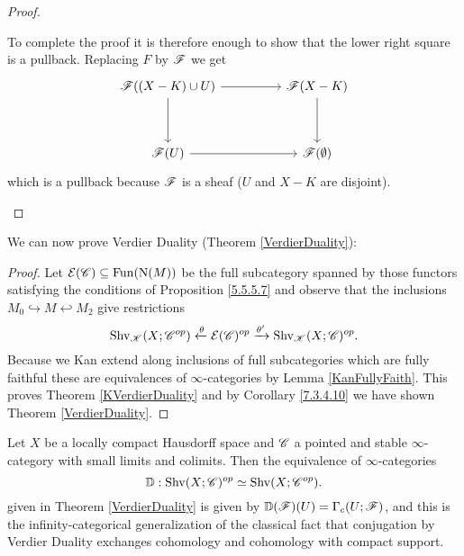 \documentclass[../../thesis.tex]{subfiles}
\begin{document}
\begin{proof}
\begin{enumerate}[label=(\alph*)]
              To complete the proof it is therefore enough to show that the lower right square is a pullback.
              Replacing $F$ by $\mathscr{F}$ we get
              \[\begin{tikzcd}
                      {\F((X-K) \cup U)} && {\F(X-K)} \\
                      \\
                      {\F(U)} && {\F(\emptyset)}
                      \arrow[from=1-1, to=1-3]
                      \arrow[from=1-3, to=3-3]
                      \arrow[from=3-1, to=3-3]
                      \arrow[from=1-1, to=3-1]
                  \end{tikzcd}\]
              which is a pullback because $\mathscr{F}$ is a sheaf ($U$ and $X-K$ are disjoint).
    \end{enumerate}
\end{proof}
We can now prove Verdier Duality (Theorem \ref{VerdierDuality}):
\begin{proof}
    Let $\mathcal{E}(\mathscr{C}) \subseteq \mathrm{Fun}(\mathrm{N}(M))$ be the full subcategory spanned by those functors satisfying the conditions of Proposition \ref{5.5.5.7} and observe that the inclusions $M_0 \hookrightarrow M \hookleftarrow M_2$ give restrictions
    \[
        \mathrm{Shv}_{\mathscr{K}}(X;\mathscr{C}^{op}) \xleftarrow{\theta} \mathcal{E}(\mathscr{C})^{op} \xrightarrow{\theta'} \mathrm{Shv}_{\mathscr{K}}(X;\mathscr{C})^{op}.
    \]
    Because we Kan extend along inclusions of full subcategories which are fully faithful these are equivalences of $\infty$-categories by Lemma \ref{KanFullyFaith}.
    This proves Theorem \ref{KVerdierDuality} and by Corollary \ref{7.3.4.10} we have shown Theorem \ref{VerdierDuality}.
\end{proof}
\begin{proposition}[{\cite[Proposition 5.5.5.10]{HA}}]
    Let $X$ be a locally compact Hausdorff space and $\mathscr{C}$ a pointed and stable $\infty$-category with small limits and colimits.
    Then the equivalence of $\infty$-categories
    \[
        \mathbb{D} : \mathrm{Shv}(X;\mathscr{C})^{op} \simeq \mathrm{Shv}(X;\mathscr{C}^{op}).
    \]
    given in Theorem \ref{VerdierDuality} is given by $\mathbb{D}(\mathscr{F})(U) = \Gamma_c(U;\mathscr{F})$, and this is the infinity-categorical generalization of the classical fact that conjugation by Verdier Duality exchanges cohomology and cohomology with compact support.
\end{proposition}
\end{document}
